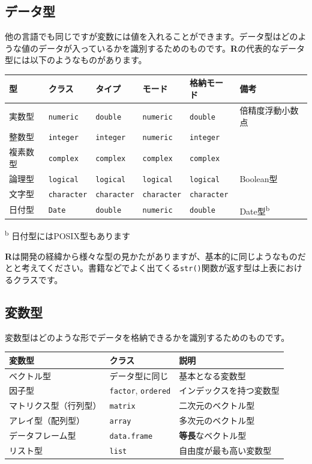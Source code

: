 \documentclass[
  12pt,
]{book}
\begin{document}
\hypertarget{ux30c7ux30fcux30bfux578b}{%
\subsection{データ型}\label{ux30c7ux30fcux30bfux578b}}

他の言語でも同じですが変数には値を入れることができます。データ型はどのような値のデータが入っているかを識別するためのものです。\textbf{R}の代表的なデータ型には以下のようなものがあります。

\begin{longtable}[]{@{}llllll@{}}
\toprule
型 & クラス & タイプ & モード & 格納モード & 備考 \\
\midrule
\endhead
実数型 & \texttt{numeric} & \texttt{double} & \texttt{numeric} & \texttt{double} & 倍精度浮動小数点 \\
整数型 & \texttt{integer} & \texttt{integer} & \texttt{numeric} & \texttt{integer} & \\
複素数型 & \texttt{complex} & \texttt{complex} & \texttt{complex} & \texttt{complex} & \\
論理型 & \texttt{logical} & \texttt{logical} & \texttt{logical} & \texttt{logical} & Boolean型 \\
文字型 & \texttt{character} & \texttt{character} & \texttt{character} & \texttt{character} & \\
日付型 & \texttt{Date} & \texttt{double} & \texttt{numeric} & \texttt{double} & Date型\textsuperscript{b} \\
\bottomrule
\end{longtable}

\textsuperscript{b} 日付型にはPOSIX型もあります

\textbf{R}は開発の経緯から様々な型の見かたがありますが、基本的に同じようなものだとと考えてください。書籍などでよく出てくる\texttt{str()}関数が返す型は上表におけるクラスです。

\hypertarget{ux5909ux6570ux578b}{%
\subsection{変数型}\label{ux5909ux6570ux578b}}

変数型はどのような形でデータを格納できるかを識別するためのものです。

\begin{longtable}[]{@{}lll@{}}
\toprule
変数型 & クラス & 説明 \\
\midrule
\endhead
ベクトル型 & データ型に同じ & 基本となる変数型 \\
因子型 & \texttt{factor}, \texttt{ordered} & インデックスを持つ変数型 \\
マトリクス型（行列型） & \texttt{matrix} & 二次元のベクトル型 \\
アレイ型（配列型） & \texttt{array} & 多次元のベクトル型 \\
データフレーム型 & \texttt{data.frame} & \textbf{等長}なベクトル型 \\
リスト型 & \texttt{list} & 自由度が最も高い変数型 \\
\bottomrule
\end{longtable}
\end{document}
